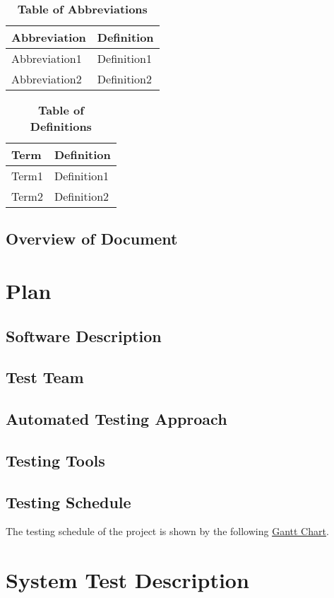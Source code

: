 \documentclass[12pt, titlepage]{article}
\begin{document}
\begin{table}[hbp]
\caption{\textbf{Table of Abbreviations}} \label{Table}
\begin{tabularx}{\textwidth}{p{3cm}X}
\toprule
\textbf{Abbreviation} & \textbf{Definition} \\
\midrule
Abbreviation1 & Definition1\\
Abbreviation2 & Definition2\\
\bottomrule
\end{tabularx}
\end{table}
\begin{table}[!htbp]
\caption{\textbf{Table of Definitions}} \label{Table}
\begin{tabularx}{\textwidth}{p{3cm}X}
\toprule
\textbf{Term} & \textbf{Definition}\\
\midrule
Term1 & Definition1\\
Term2 & Definition2\\
\bottomrule
\end{tabularx}
\end{table}	
\subsection{Overview of Document}
\section{Plan}
	
\subsection{Software Description}
\subsection{Test Team}
\subsection{Automated Testing Approach}
\subsection{Testing Tools}
\subsection{Testing Schedule}
The testing schedule of the project is shown by the following
 \href{run:../DevelopmentPlan/GanttChart.gan} {\underline{Gantt Chart}}.
\section{System Test Description}
\end{document}
